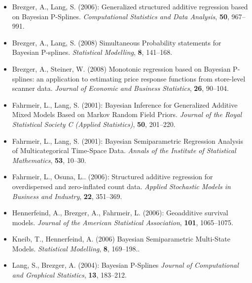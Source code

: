 \documentclass[11pt,a4paper,twoside]{bayesxarticle}
\begin{document}
\begin{itemize}
\item Brezger, A., Lang, S. (2006): Generalized structured additive regression based on Bayesian P-Splines. {\it
    Computational Statistics and Data Analysis}, {\bf 50}, 967--991.
    \vspace{-0.25cm}
\item Brezger, A., Lang, S. (2008)
      Simultaneous Probability statements for Bayesian P-splines.
      {\it Statistical Modelling}, {\bf 8},
      141--168.\vspace{-0.25cm}
\item Brezger, A., Steiner, W. (2008)
Monotonic regression based on Bayesian P-splines: an
application to estimating price response functions from
store-level scanner data. {\it Journal of Economic and Business Statistics}, {\bf 26}, 90--104.
\vspace{-0.25cm}
\item Fahrmeir, L., Lang, S. (2001): Bayesian Inference for Generalized Additive Mixed Models Based on Markov Random Field
    Priors. {\it Journal of the Royal Statistical Society C (Applied Statistics)}, {\bf 50}, 201--220.\vspace{-0.25cm}
\item Fahrmeir, L., Lang, S. (2001): Bayesian Semiparametric Regression Analysis of Multicategorical Time-Space Data. {\it
    Annals of the Institute of Statistical Mathematics}, {\bf 53}, 10--30.\vspace{-0.25cm}
\item Fahrmeir, L., Osuna, L.. (2006): Structured additive regression for overdispersed and zero-inflated count data. {\it
    Applied Stochastic Models in Business and Industry}, {\bf 22}, 351--369.\vspace{-0.25cm}
\item Hennerfeind, A., Brezger, A., Fahrmeir, L. (2006): Geoadditive survival models. {\it Journal of the American
    Statistical Association}, {\bf 101}, 1065--1075.\vspace{-0.25cm}
\item Kneib, T., Hennerfeind, A. (2006) Bayesian Semiparametric Multi-State Models. {\it Statistical Modelling}, {\bf 8},
    169--198..\vspace{-0.25cm}
\item Lang, S., Brezger, A. (2004): Bayesian P-Splines {\it Journal of Computational and Graphical Statistics}, {\bf 13},
    183--212.
\end{itemize}
\end{document}

